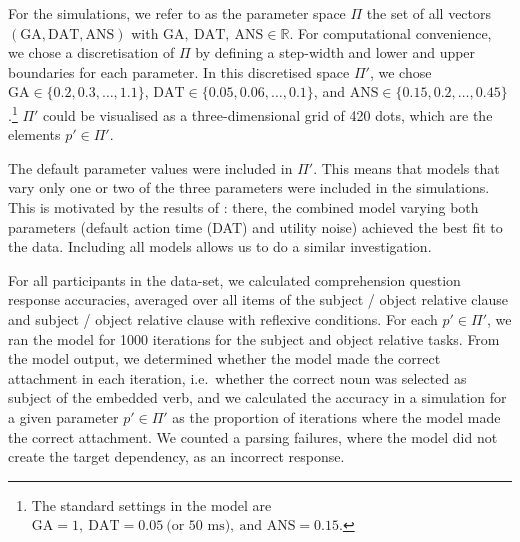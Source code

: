 \documentclass[10pt,letterpaper]{article}
\begin{document}
For the simulations, we refer to as the parameter space $\Pi$ the set of all vectors $(\text{GA}, \text{DAT}, \text{ANS})$ with $\text{GA},\ \text{DAT},\ \text{ANS} \in \mathbb{R}$.
For computational convenience, we chose a discretisation of $\Pi$ by defining a step-width and lower and upper boundaries for each parameter. In this discretised space $\Pi'$, we chose $\text{GA} \in \{0.2, 0.3, \ldots, 1.1\}$, $\text{DAT} \in \{0.05, 0.06, \ldots, 0.1\}$, and $\text{ANS} \in \{0.15, 0.2, \ldots, 0.45\}$.\footnote{The standard settings in the  model are $\text{GA} = 1,\ \text{DAT} = 0.05\ \text{(or 50 ms)},\ \text{and ANS} = 0.15$.} $\Pi'$ could be visualised as a three-dimensional grid of 420 dots, which are the elements $p' \in \Pi'$.


The default parameter values were included in $\Pi'$. This means that models that vary only one or two of the three parameters were included in the simulations. This is motivated by the results of : there, the combined model varying both parameters (default action time (DAT) and utility noise) achieved the best fit to the data. Including all models allows us to do a similar investigation.

For all participants in the  data-set, we calculated comprehension question response accuracies, averaged over all items of the subject / object relative clause and subject / object relative clause with reflexive conditions. For each $p' \in \Pi'$, we ran the model for 1000 iterations for the subject and object relative tasks.
From the model output, we determined whether the model made the correct attachment in each iteration, i.e.\ whether the correct noun was selected as subject of the embedded verb, and we calculated the accuracy in a simulation for a given parameter $p' \in \Pi'$ as the proportion of iterations where the model made the correct attachment. We counted a parsing failures, where the model did not create the target dependency, as an incorrect response.
\end{document}
